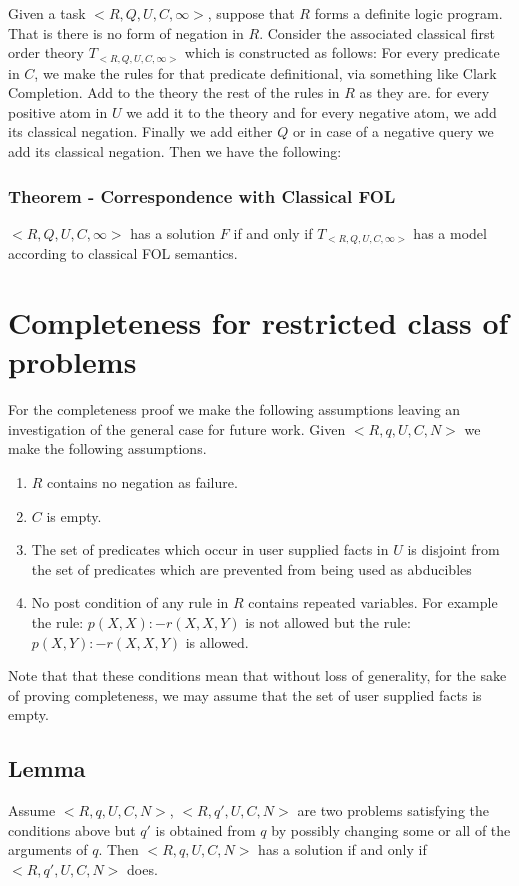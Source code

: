\documentclass[sigconf]{acmart}
\begin{document}
Given a task $<R,Q,U,C,\infty>$, suppose that $R$ forms a definite logic
program. That is there is no form of negation in $R$. Consider the associated
classical first order theory $T_{<R,Q,U,C,\infty>}$ which is constructed as
follows: For every predicate in $C$, we make the rules for that predicate
definitional, via something like Clark Completion. Add to the theory the rest
of the rules in $R$ as they are. for every positive atom in $U$ we add it to
the theory and for every negative atom, we add its classical negation. Finally
we add either $Q$ or in case of a negative query we add its classical
negation. Then we have the following:

\subsubsection{Theorem - Correspondence with Classical FOL}
$<R,Q,U,C,\infty>$ has a solution $F$ if and only if $T_{<R,Q,U,C,\infty>}$ has a model according to classical FOL semantics.


\section{Completeness for restricted class of problems}
For the completeness proof we make the following assumptions leaving an investigation of the general case for future work. Given $<R,q,U,C,N>$ we make the following assumptions.

\begin{enumerate}
\item $R$ contains no negation as failure.
\item $C$ is empty.
\item The set of predicates which occur in user supplied facts in $U$ is
  disjoint from the set of predicates which are prevented from being used as
  abducibles
\item No post condition of any rule in $R$ contains repeated variables. For example the rule:
$p(X,X):-r(X,X,Y)$ is not allowed but the rule: $p(X,Y):-r(X,X,Y)$ is allowed.
\end{enumerate}

Note that that these conditions mean that without loss of generality, for the
sake of proving completeness, we may assume that the set of user supplied
facts is empty.

\subsection{Lemma}
Assume $<R,q,U,C,N>$, $<R,q',U,C,N>$ are two problems satisfying the conditions above but $q'$ is obtained from $q$ by possibly changing some or all of the arguments of $q$. Then $<R,q,U,C,N>$ has a solution if and only if $<R,q',U,C,N>$ does.
\end{document}
